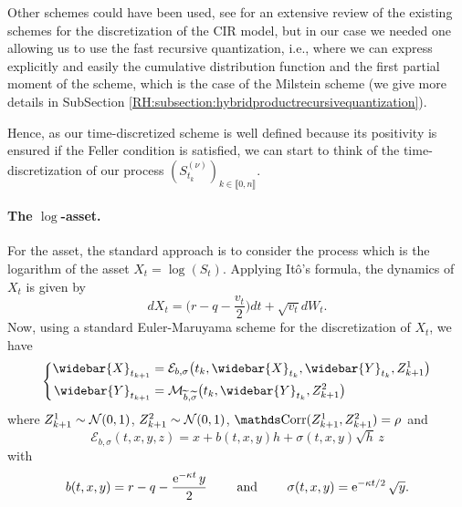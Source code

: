 Other schemes could have been used, see \cite{alfonsi2005discretization} for an extensive review of the existing schemes for the discretization of the CIR model, but in our case we needed one allowing us to use the fast recursive quantization, i.e., where we can express explicitly and easily the cumulative distribution function and the first partial moment of the scheme, which is the case of the Milstein scheme (we give more details in SubSection \ref{RH:subsection:hybridproductrecursivequantization}).

Hence, as our time-discretized scheme is well defined because its positivity is ensured if the Feller condition is satisfied, we can start to think of the time-discretization of our process $( S_{t_k}^{(\nu)} )_{k \in \llbracket 0, n \rrbracket}$.


\paragraph{The $\log$-asset.}

For the asset, the standard approach is to consider the process which is the logarithm of the asset $X_t = \log (S_t)$. Applying Itô's formula, the dynamics of $X_t$ is given by
\begin{equation}
	d X_t = \Big( r - q - \frac{v_t}{2} \Big) dt + \sqrt{v_t} d W_t.
\end{equation}
Now, using a standard Euler-Maruyama scheme for the discretization of $X_t$, we have
\begin{equation}\label{RH:discretized_couple}
	\left\{
	\begin{aligned}
		\widebar{X}_{t_{k+1}} & = \mathcal{E}_{b, \sigma} \big( t_k, \widebar{X}_{t_k}, \widebar{Y}_{t_k}, Z_{k+1}^1 \big)    \\
		\widebar{Y}_{t_{k+1}} & = \mathcal{M}_{\widetilde b, \widetilde \sigma} \big( t_k, \widebar{Y}_{t_k}, Z_{k+1}^2 \big)
	\end{aligned}
	\right.
\end{equation}
where $Z_{k+1}^1 \sim \operatorname{\mathcal{N}}(0,1)$, $Z_{k+1}^2 \sim \operatorname{\mathcal{N}}(0,1)$, $\Corr (Z_{k+1}^1, Z_{k+1}^2) = \rho$ and
\begin{equation} \label{RH:eulerscheme}
	\mathcal{E}_{b, \sigma} (t,x,y,z) = x + b(t,x,y) h + \sigma (t,x,y) \sqrt{ h } \, z
\end{equation}
with
\begin{equation}\label{RH:drift_and_vol_logasset}
	b(t,x,y) = r - q - \frac{\operatorname{e}^{-\kappa t} y}{2} \qquad \textrm{ and } \qquad \sigma (t,x,y) = \operatorname{e}^{-\kappa t / 2} \sqrt{y}.
\end{equation}





